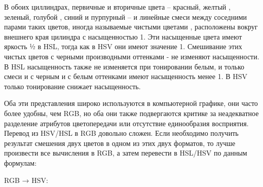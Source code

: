 В обоих циллиндрах, первичные и вторичные цвета -- красный, желтый , зеленый, голубой , синий и пурпурный  -- и линейные смеси между соседними парами таких цветов, иногда называемые чистыми цветами , расположены вокруг внешнего края цилиндра с насыщенностью 1. Эти насыщенные цвета имеют яркость ½ в HSL, тогда как в HSV они имеют значение 1. Смешивание этих чистых цветов с черными  производными оттенками - не изменяют насыщенности. В HSL насыщенность также не изменяется при тонировании белым, и только смеси и с черным и с белым оттенками имеют насыщенность менее 1. В HSV только тонирование снижает насыщенность.

\begin{figure}[ht!]
\end{figure}


Оба эти представления широко используются в компьютерной графике, они часто более удобны, чем RGB, но оба они также подвергаются критике за неадекватное разделение атрибутов цветопередачи или отсутствие единообразия восприятия. Перевод из HSV/HSL в RGB довольно сложен. Если  необходимо получить результат смешения двух цветов в одном из этих двух форматов, то лучше произвести все вычисления в RGB, а затем перевести в HSL/HSV по данным формулам: 

RGB → HSV: 

